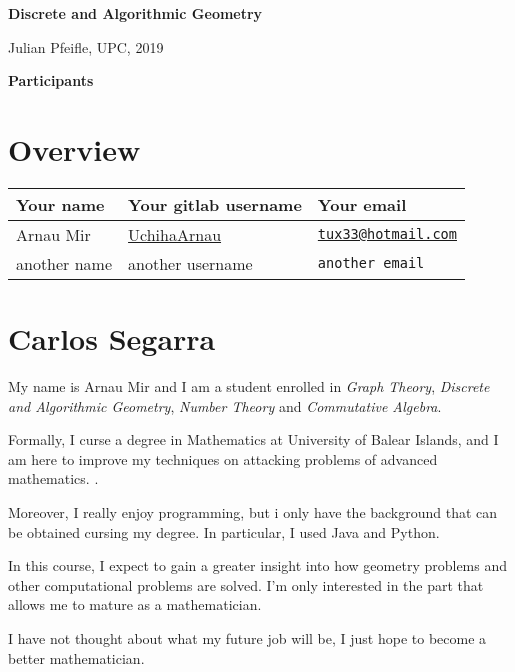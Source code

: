 \documentclass[11pt]{amsart}
\begin{document}
\begin{center}
\textbf{\sffamily
   Discrete and Algorithmic Geometry }

\medskip
   Julian Pfeifle,
   UPC, 2019
\end{center}

\bigskip

\begin{center}
  \textbf{\sffamily Participants}
\end{center}

\medskip

\section*{Overview}

\begin{center}
  \begin{tabular}[c]{lll}
    Your name
    & Your gitlab username
    & Your email
    \\\hline
    Arnau Mir
    & \href{https://gitlab.com/UchihaArnau}{UchihaArnau}
    & \texttt{\href{mailto:tux33@hotmail.com}{tux33@hotmail.com}}
    \\
    another name
    & another username
    & \texttt{another email}
  \end{tabular}
\end{center}

\section*{Carlos Segarra}

My name is Arnau Mir and I am a student enrolled in \textit{Graph Theory}, \textit{Discrete and Algorithmic Geometry}, \textit{Number Theory} and \textit{Commutative Algebra}.

Formally, I curse a degree in Mathematics at University of Balear Islands, and I am here to improve my techniques on attacking problems of advanced mathematics.
.

Moreover, I really enjoy programming, but i only have the background that can be obtained cursing my degree.
In particular, I used Java and Python.


In this course, I expect to gain a greater insight into how geometry problems and other computational problems are solved.
I'm only interested in the part that allows me to mature as a mathematician.

I have not thought about what my future job will be, I just hope to become a better mathematician.
\medskip
\end{document}
